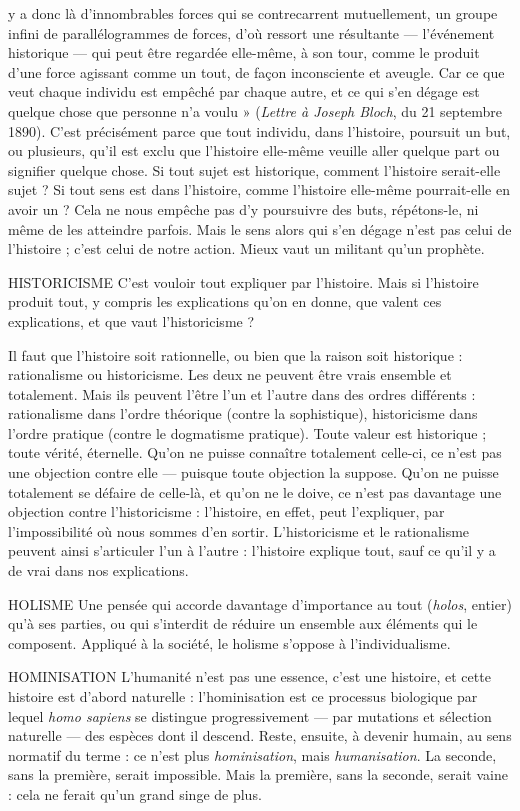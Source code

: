 y a donc là d'innombrables forces qui se contrecarrent mutuellement, un
groupe infini de parallélogrammes de forces, d’où ressort une résultante — l’événement
historique — qui peut être regardée elle-même, à son tour, comme le
produit d’une force agissant comme un tout, de façon inconsciente et aveugle.
Car ce que veut chaque individu est empêché par chaque autre, et ce qui s’en
dégage est quelque chose que personne n’a voulu » ({\it Lettre à Joseph Bloch}, du
21 septembre 1890). C’est précisément parce que tout individu, dans l’histoire,
poursuit un but, ou plusieurs, qu’il est exclu que l’histoire elle-même veuille
aller quelque part ou signifier quelque chose. Si tout sujet est historique, comment
l’histoire serait-elle sujet ? Si tout sens est dans l’histoire, comme l’histoire
elle-même pourrait-elle en avoir un ? Cela ne nous empêche pas d’y poursuivre
des buts, répétons-le, ni même de les atteindre parfois. Mais le sens alors qui
s’en dégage n’est pas celui de l’histoire ; c’est celui de notre action. Mieux vaut
un militant qu’un prophète.

HISTORICISME C'est vouloir tout expliquer par l’histoire. Mais si l’histoire
produit tout, y compris les explications qu’on en donne,
que valent ces explications, et que vaut l’historicisme ?

Il faut que l’histoire soit rationnelle, ou bien que la raison soit historique :
rationalisme ou historicisme. Les deux ne peuvent être vrais ensemble et totalement.
Mais ils peuvent l’être l’un et l’autre dans des ordres différents : rationalisme
dans l’ordre théorique (contre la sophistique), historicisme dans l’ordre
pratique (contre le dogmatisme pratique). Toute valeur est historique ; toute
vérité, éternelle. Qu’on ne puisse connaître totalement celle-ci, ce n’est pas une
objection contre elle — puisque toute objection la suppose. Qu’on ne puisse
totalement se défaire de celle-là, et qu’on ne le doive, ce n’est pas davantage une
objection contre l’historicisme : l’histoire, en effet, peut l’expliquer, par
l'impossibilité où nous sommes d’en sortir. L’historicisme et le rationalisme
peuvent ainsi s’articuler l’un à l’autre : l’histoire explique tout, sauf ce qu’il y a
de vrai dans nos explications.

HOLISME Une pensée qui accorde davantage d’importance au tout ({\it holos},
entier) qu’à ses parties, ou qui s’interdit de réduire un ensemble
aux éléments qui le composent. Appliqué à la société, le holisme s’oppose à
l’individualisme.

HOMINISATION  L’humanité n’est pas une essence, c’est une histoire, et
cette histoire est d’abord naturelle : l’hominisation est ce
processus biologique par lequel {\it homo sapiens} se distingue progressivement — par
mutations et sélection naturelle — des espèces dont il descend. Reste, ensuite, à
devenir humain, au sens normatif du terme : ce n’est plus {\it hominisation}, mais
{\it humanisation}. La seconde, sans la première, serait impossible. Mais la première,
sans la seconde, serait vaine : cela ne ferait qu’un grand singe de plus.

